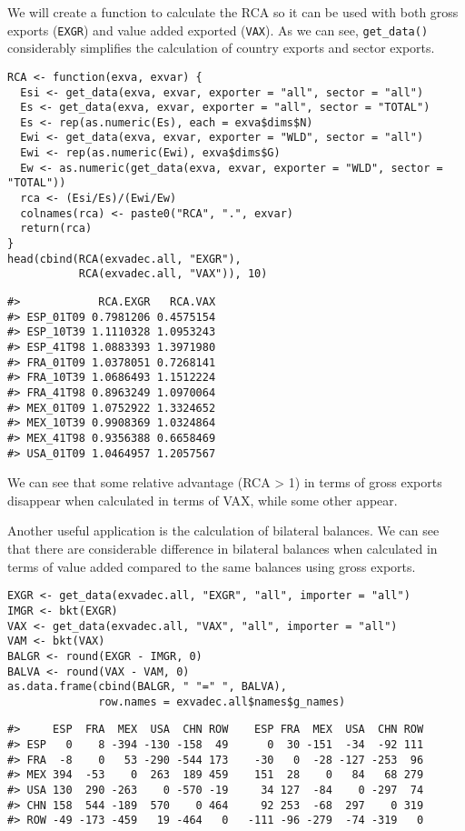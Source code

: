 We will create a function to calculate the RCA so it can be used with both
gross exports (\texttt{EXGR}) and value added exported (\texttt{VAX}). As we can see,
\texttt{get\_data()} considerably simplifies the calculation of country exports
and sector exports.

\begin{verbatim}
RCA <- function(exva, exvar) {
  Esi <- get_data(exva, exvar, exporter = "all", sector = "all")
  Es <- get_data(exva, exvar, exporter = "all", sector = "TOTAL")
  Es <- rep(as.numeric(Es), each = exva$dims$N)
  Ewi <- get_data(exva, exvar, exporter = "WLD", sector = "all")
  Ewi <- rep(as.numeric(Ewi), exva$dims$G)
  Ew <- as.numeric(get_data(exva, exvar, exporter = "WLD", sector = "TOTAL"))
  rca <- (Esi/Es)/(Ewi/Ew)
  colnames(rca) <- paste0("RCA", ".", exvar)
  return(rca)
}
head(cbind(RCA(exvadec.all, "EXGR"),
           RCA(exvadec.all, "VAX")), 10)
\end{verbatim}

\begin{verbatim}
#>            RCA.EXGR   RCA.VAX
#> ESP_01T09 0.7981206 0.4575154
#> ESP_10T39 1.1110328 1.0953243
#> ESP_41T98 1.0883393 1.3971980
#> FRA_01T09 1.0378051 0.7268141
#> FRA_10T39 1.0686493 1.1512224
#> FRA_41T98 0.8963249 1.0970064
#> MEX_01T09 1.0752922 1.3324652
#> MEX_10T39 0.9908369 1.0324864
#> MEX_41T98 0.9356388 0.6658469
#> USA_01T09 1.0464957 1.2057567
\end{verbatim}

We can see that some relative advantage (RCA \textgreater{} 1) in terms of gross exports
disappear when calculated in terms of VAX, while some other appear.

Another useful application is the calculation of bilateral balances. We can
see that there are considerable difference in bilateral balances when
calculated in terms of value added compared to the same balances using gross
exports.

\begin{verbatim}
EXGR <- get_data(exvadec.all, "EXGR", "all", importer = "all")
IMGR <- bkt(EXGR)
VAX <- get_data(exvadec.all, "VAX", "all", importer = "all")
VAM <- bkt(VAX)
BALGR <- round(EXGR - IMGR, 0)
BALVA <- round(VAX - VAM, 0)
as.data.frame(cbind(BALGR, " "=" ", BALVA),
              row.names = exvadec.all$names$g_names)
\end{verbatim}

\begin{verbatim}
#>     ESP  FRA  MEX  USA  CHN ROW    ESP FRA  MEX  USA  CHN ROW
#> ESP   0    8 -394 -130 -158  49      0  30 -151  -34  -92 111
#> FRA  -8    0   53 -290 -544 173    -30   0  -28 -127 -253  96
#> MEX 394  -53    0  263  189 459    151  28    0   84   68 279
#> USA 130  290 -263    0 -570 -19     34 127  -84    0 -297  74
#> CHN 158  544 -189  570    0 464     92 253  -68  297    0 319
#> ROW -49 -173 -459   19 -464   0   -111 -96 -279  -74 -319   0
\end{verbatim}

